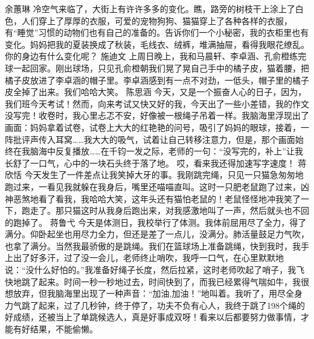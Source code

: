 {}\markdownRendererInterblockSeparator
{}余蕙琳\markdownRendererInterblockSeparator
{}冷空气来临了，大街上有许许多多的变化。瞧，路旁的树枝干上涂上了白色，人们穿上了厚厚的衣服，可爱的宠物狗狗、猫猫穿上了各种各样的衣服，有“睡觉”习惯的动物们也有自己的准备的。告诉你们一个小秘密，我的衣柜里也有变化。妈妈把我的夏装换成了秋装，毛线衣、绒裤，堆满抽屉，看得我眼花缭乱。你的身边有什么变化呢？\markdownRendererInterblockSeparator
{}\markdownRendererInterblockSeparator
{}施迪文\markdownRendererInterblockSeparator
{}上周日晚上，我和马晨轩、李卓涵、孔俞橙练完球一起回家。刚出球场，只见孔俞橙朝我们晃了晃自己手中的橘子皮，猫着腰，把橘子皮放进了李卓涵的帽子里。李卓涵感到有一点不对劲，一低头，帽子里的橘子皮全掉了出来。我们哈哈大笑。\markdownRendererInterblockSeparator
{}\markdownRendererInterblockSeparator
{}陈思涵\markdownRendererInterblockSeparator
{}今天，又是一个振奋人心的日子，因为，我们班今天考试！然而，向来考试又快又好的我，今天出了一些小差错，我的作文没写完！收卷时，我心里忐忑不安，好像被一根绳子吊着一样。我脑海里浮现出了画面：妈妈拿着试卷，试卷上大大的红艳艳的问号，吸引了妈妈的眼球，接着，一阵批评声传入耳窝……我大大的吸气，试着让自己转移注意力，但是，那个画面始终在我脑海中反复播放……在千钧一发之际，老师的一句：“没写完的，补上”让我长舒了一口气，心中的一块石头终于落了地。\markdownRendererInterblockSeparator
{}哎，看来我还得加速写字速度！\markdownRendererInterblockSeparator
{}\markdownRendererInterblockSeparator
{}蒋欣恬\markdownRendererInterblockSeparator
{}今天发生了一件差点让我笑掉大牙的事。我刚跳完绳，只见一只猫急匆匆地跑过来，一看见我就躲在我身后，嘴里还喵喵直叫。这时一只肥老鼠跑了过来，凶神恶煞地看了看我，我哈哈大笑，这年头还有猫怕老鼠的！老鼠怪怪地冲我笑了一下，跑走了。那只猫这时从我身后跑出来，对我感激地叫了一声，然后就头也不回的跑掉了。\markdownRendererInterblockSeparator
{}\markdownRendererInterblockSeparator
{}蒋鲁弋\markdownRendererInterblockSeparator
{}今天是体测日，我校举行了体测。我体前屈用尽了全力，得了满分。仰卧起坐也用尽力全力，但还是差了一点儿，没满分。肺活量鼓足力气吹，也拿了满分。当然我最骄傲的是跳绳。我们在篮球场上准备跳绳，快到我时，我手上出了好多汗，过了没一会儿，老师终止哨吹，我呼一口气，在心里默默地说：“没什么好怕的。”我准备好绳子长度，然后拉紧，这时老师吹起了哨子，我飞快地跳了起来。时间一秒一秒地过去，时间快到了，而我已经累得气喘如牛，我很想放弃，但我脑海里出现了一种声音：“加油,加油！”地叫着。我听了，用尽全身力气跳了起来，过了几秒钟，终于停了，功夫不负有心人，我终于跳了198个绳的好成绩，还被当上了单跳候选人，真是好事成双呀！看来以后都要努力做事情，才能有好结果，不能偷懒。\markdownRendererInterblockSeparator

